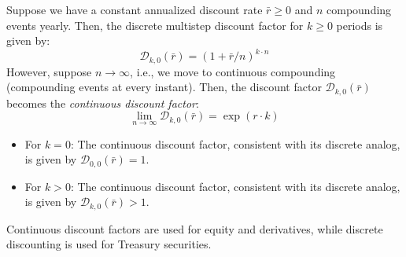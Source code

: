 \documentclass[11pt]{article}
\theoremstyle{definition}
\begin{document}
\begin{definition}\label{defn:continuous-compounding}
Suppose we have a constant annualized discount rate $\bar{r}\geq{0}$ and $n$ compounding events yearly. Then, the discrete 
multistep discount factor for $k\geq{0}$ periods is given by:
\begin{equation*}
\mathcal{D}_{k,0}(\bar{r}) = (1+\bar{r}/n)^{k\cdot{n}}
\end{equation*}
However, suppose $n\rightarrow\infty$, i.e., we move to continuous compounding (compounding events at every instant).
Then, the discount factor $\mathcal{D}_{k,0}(\bar{r})$ becomes the \textit{continuous discount factor}:
\begin{equation*}
    \lim\limits_{n\rightarrow\infty}\mathcal{D}_{k,0}(\bar{r}) = \exp\left(r\cdot{k}\right)
\end{equation*}
\begin{itemize}[leftmargin=*]
\item{For $k=0$: The continuous discount factor, consistent with its discrete analog, is given by $\mathcal{D}_{0,0}(\bar{r}) = 1$.}
\item{For $k>0$: The continuous discount factor, consistent with its discrete analog, is given by $\mathcal{D}_{k,0}(\bar{r}) > 1$.}
\end{itemize}
\end{definition}
Continuous discount factors are used for equity and derivatives, while discrete discounting is used for Treasury securities.
\end{document}
